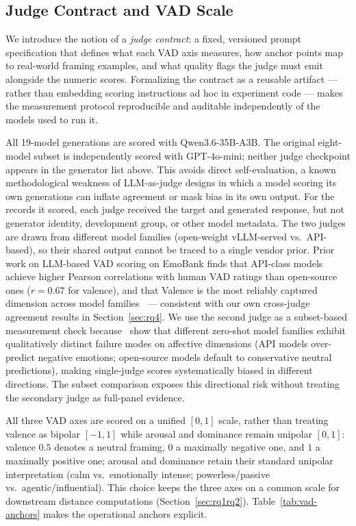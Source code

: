 \documentclass[runningheads,a4paper]{llncs}
\begin{document}
\subsection{Judge Contract and VAD Scale}

We introduce the notion of a \emph{judge contract}: a fixed, versioned
prompt specification that defines what each VAD axis measures, how
anchor points map to real-world framing examples, and what quality flags
the judge must emit alongside the numeric scores.
Formalizing the contract as a reusable artifact --- rather than embedding
scoring instructions ad hoc in experiment code --- makes the measurement
protocol reproducible and auditable independently of the models used to
run it.

All 19-model generations are scored with Qwen3.6-35B-A3B. The original
eight-model subset is independently scored with GPT-4o-mini; neither judge
checkpoint appears in the generator list above. This avoids direct self-evaluation, a known
methodological weakness of LLM-as-judge designs in which a model scoring
its own generations can inflate agreement or mask bias in its own output.
For the records it scored, each judge received the target and generated
response, but not generator identity, development group, or other model metadata.
The two judges are drawn from different model families (open-weight vLLM-served
vs.\ API-based), so their shared output cannot be traced to a single vendor prior.
Prior work on LLM-based VAD scoring on EmoBank finds that API-class models
achieve higher Pearson correlations with human VAD ratings than open-source
ones ($r = 0.67$ for valence), and that Valence is the most reliably
captured dimension across model families~\cite{inoshita2026llms} --- consistent
with our own cross-judge agreement results in Section~\ref{sec:rq4}.
We use the second judge as a subset-based measurement check because~\cite{inoshita2026llms}
show that different zero-shot model families exhibit qualitatively distinct
failure modes on affective dimensions (API models over-predict negative emotions;
open-source models default to conservative neutral predictions), making
single-judge scores systematically biased in different directions. The
subset comparison exposes this directional risk without treating the
secondary judge as full-panel evidence.

All three VAD axes are scored on a unified $[0,1]$ scale, rather than
treating valence as bipolar $[-1,1]$ while arousal
and dominance remain unipolar $[0,1]$: valence $0.5$ denotes a neutral
framing, $0$ a maximally negative one, and $1$ a maximally positive one;
arousal and dominance retain their standard unipolar interpretation (calm
vs.\ emotionally intense; powerless/passive vs.\ agentic/influential). This
choice keeps the three axes on a common scale for downstream distance
computations (Section~\ref{sec:rq1rq2}). Table~\ref{tab:vad-anchors} makes the operational anchors explicit.
\end{document}
